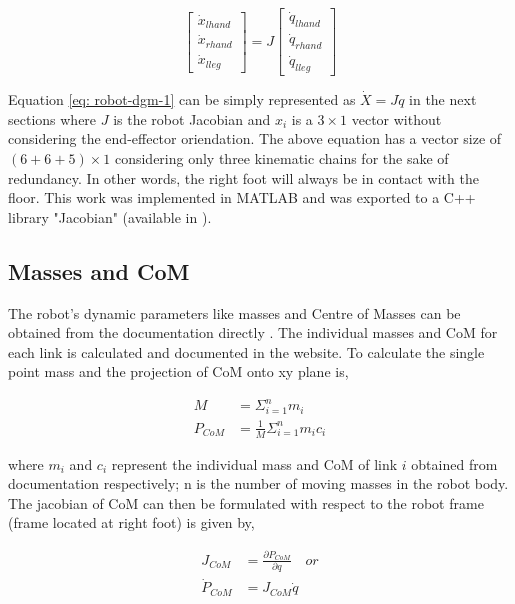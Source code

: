 \begin{equation}
    \label{eq: robot-dgm-1}
    \begin{bmatrix}
        \dot{x}_{lhand} \\ \dot{x}_{rhand} \\ \dot{x}_{lleg} 
    \end{bmatrix} = J \begin{bmatrix}
        \dot{q}_{lhand} \\ \dot{q}_{rhand} \\ \dot{q}_{lleg}
    \end{bmatrix}
\end{equation}

Equation \ref{eq: robot-dgm-1} can be simply represented as $\dot{X} = J\dot{q}$ in the next sections where $J$ is the robot Jacobian and $x_i$ is a $3 \times 1$ vector without
considering the end-effector oriendation. The above equation has a vector size of $(6 + 6 +5) \times 1$ considering only three kinematic chains for the sake of redundancy. 
In other words, the right foot will always be in contact with the floor. 
This work was implemented in MATLAB and was exported to a C++ library "Jacobian" (available in \cite{github}). 

\subsection{Masses and CoM}

The robot's dynamic parameters like masses and Centre of Masses can be obtained from the 
documentation directly \cite{aldebaran-masses}. The individual masses and CoM for each link 
is calculated and documented in the website. To calculate the single point mass and the projection of 
CoM onto xy plane is,

\begin{align}
    \label{eq: robot-mass-com}
    M &= \Sigma_{i = 1}^n m_i \\
    P_{CoM} &= \frac{1}{M}\Sigma_{i = 1}^n m_ic_i
\end{align}

where $m_i$ and $c_i$ represent the individual mass and CoM of link $i$ obtained from documentation respectively; n is the number of moving masses 
in the robot body. The jacobian of CoM can then be formulated with respect to the robot frame (frame located at right foot) is given by,

\begin{align}
    \label{eq: robot-mass-com-2}
    J_{CoM} &= \frac{\partial P_{CoM}}{\partial q} \quad \mathit{or} \\
    \dot{P}_{CoM} &= J_{CoM} \dot{q}
\end{align}

